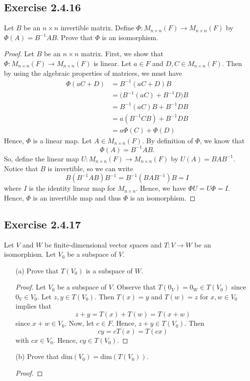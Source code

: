\subsection*{Exercise 2.4.16} Let \( B  \) be an \( n \times n  \) invertible matrix. Define \( \Phi: {M}_{n \times n}(F) \to {M}_{n \times n }(F) \) by \( \Phi(A) = B^{-1} A B  \). Prove that \( \Phi  \) is an isomorphism.
\begin{proof}
    Let \( B  \) be an \( n \times n  \) matrix. First, we show that \( \Phi: {M}_{n \times n}(F) \to {M}_{n \times n}(F)   \) is linear. 
    Let \( a \in F  \) and \( D, C \in {M}_{n \times n}(F) \). Then by using the algebraic properties of matrices, we must have
    \begin{align*}
        \Phi(aC + D) &= B^{-1}(aC + D)B \\
                  &=  \Big( B^{-1}(aC) + B^{-1}D \Big) B \\ 
                  &= B^{-1}(aC)B + B^{-1} D B \\
                  &= a (B^{-1} C B) + B^{-1}D B \\
                  &= a\Phi(C) + \Phi(D)
    \end{align*}
    Hence, \( \Phi  \) is a linear map. Let \( A \in {M}_{n \times n }(F) \). By definition of \( \Phi  \), we know that 
    \[  \Phi(A) = B^{-1}A B. \]
    So, define the linear map \( U: {M}_{n \times n}(F) \to {M}_{n \times n}(F) \) by \( U(A) = B A B^{-1} \).
    Notice that \( B  \) is invertible, so we can write
    \[  B (B^{-1} A B) B^{-1}  = B^{-1} (B A B^{-1}) B = I \] where \( I  \) is the identity linear map for \( {M}_{n \times n } \).
    Hence, we have \( \Phi U = U \Phi = I  \). Hence, \( \Phi  \) is an invertible map and thus \( \Phi  \) is an isomorphism.
\end{proof}

\subsection*{Exercise 2.4.17} Let \( V  \) and \( W  \) be finite-dimensional vector spaces and \( T: V \to W  \) be an isomorphism. Let \( {V}_{0} \) be a subspace of \( V  \).
\begin{enumerate}
    \item[(a)] Prove that \( T({V}_{0})  \) is a subspace of \( W  \).
        \begin{proof}
            Let \( {V}_{0}  \) be a subspace of \( V \). Observe that \( T({0}_{V}) = {0}_{W} \in T({V}_{0}) \) since \( {0}_{V} \in {V}_{0} \). Let \( z,y \in T({V}_{0}) \). Then \( T(x) = y  \) and \( T(w) = z  \) for \( x,w \in {V}_{0}  \) implies that
            \[  z + y = T(x) + T(w) = T(x+w) \]
            since \( x+w \in {V}_{0} \). Now, let \( c \in F  \). Hence, \( z + y \in T({V}_{0}) \). Then 
            \[  cy = cT(x) = T(cx) \]
            with \( cx \in {V}_{0} \). Hence, \( cy \in T({V}_{0})\).
        \end{proof}
    \item[(b)] Prove that \( \text{dim}({V}_{0}) = \text{dim}(T({V}_{0})) \).
        \begin{proof}
        
        \end{proof}
\end{enumerate}
